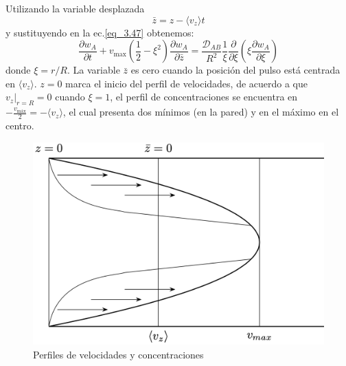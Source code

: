 \noindent Utilizando la variable desplazada
\begin{equation}
\bar{z} = z - \langle v_z \rangle t
\end{equation}
y sustituyendo en la ec.\eqref{eq_3.47} obtenemos:
\begin{equation}
\frac{\partial w_A}{\partial t}
+ v_{\mathrm{max}} \left( \frac{1}{2} - \xi^2 \right)
\frac{\partial w_A}{\partial \bar{z}}
= \frac{\mathscr{D}_{AB}}{R^2}
\frac{1}{\xi} \frac{\partial}{\partial \xi}
\left( \xi \frac{\partial w_A}{\partial \xi} \right)
\end{equation}
donde $\xi =r/R$. La variable $\bar{z}$ es cero cuando la posición del pulso está centrada en $\langle v_z\rangle$. $z=0$ marca el inicio del perfil de velocidades, de acuerdo a que $v_z|_{r=R}=0$ cuando $\xi =1$, el perfil de concentraciones se encuentra en $-\frac{v_{\text{máx}}}{2}=-\langle v_z \rangle$, el cual presenta dos mínimos (en la pared) y en el máximo en el centro. 
\begin{figure}[h]
    \centering
    \includegraphics[width=0.5\linewidth]{Capitulo3/Imagenes/Fig_3.5.png}
    \caption{Perfiles de velocidades y concentraciones}
    \label{fig:Fig_3.5}
\end{figure}

